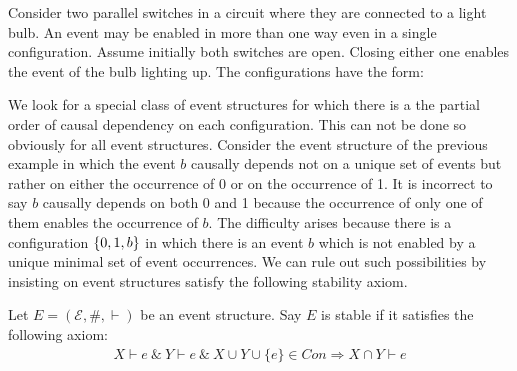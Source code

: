 \begin{example}
    Consider two parallel switches in a circuit where they are connected
    to a light bulb.
    An event may be enabled in more than one way even in a single configuration.
    Assume initially both switches are open.
    Closing either one enables the event of the bulb lighting up.
    The configurations have the form:
    \begin{center}
    \end{center}
\end{example}
We look for a special class of event structures for which there is a
the partial order of causal dependency on each configuration.
This can not be done so obviously for all event structures.
Consider the event structure of the previous example in which
the event $b$ causally depends not on a unique set of events
but rather on either the occurrence of 0 or on the occurrence of 1.
It is incorrect to say $b$ causally depends on both 0 and 1 because
the occurrence of only one of them enables the occurrence of $b$.
The difficulty arises because there is a configuration $\{0,1,b\}$
in which there is an event $b$ which is not enabled by a unique minimal
set of event occurrences.
We can rule out such possibilities by insisting on event structures
satisfy the following stability axiom.
\begin{definition}
    Let $E = (\mathcal{E},\#,\vdash)$ be an event structure. Say $E$ is stable if it satisfies the following axiom:
    \begin{align*}
        X \vdash e \ \& \ Y \vdash e \ \& \ X \cup Y \cup \{e\} \in Con \Rightarrow X \cap Y \vdash e
    \end{align*}
\end{definition}
